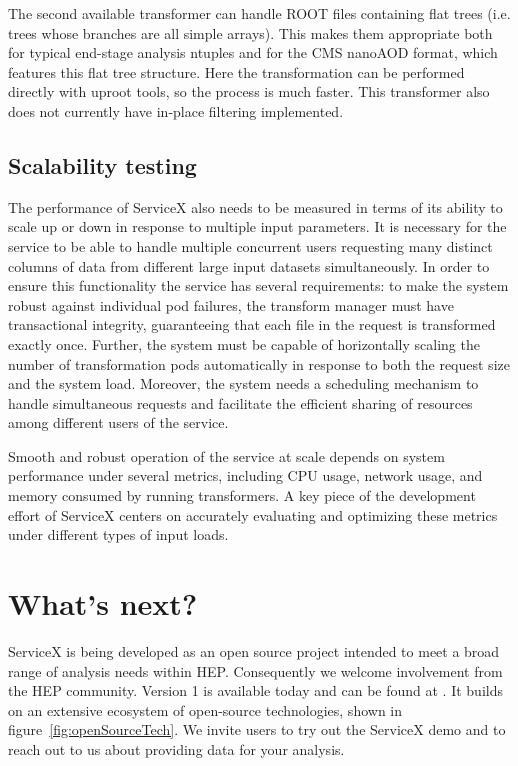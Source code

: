 \documentclass{webofc}
\begin{document}
The second available transformer can handle ROOT files containing flat trees (i.e. trees whose
branches are all simple arrays). This makes them appropriate both for typical end-stage analysis
ntuples and for the CMS nanoAOD format, which features this flat tree structure. Here the
transformation can be performed directly with uproot tools, so the process is much faster. This
transformer also does not currently have in-place filtering implemented.

\subsection{Scalability testing}
\label{subsec:scaling}

The performance of ServiceX also needs to be measured in terms of its ability to scale up or down
in response to multiple input parameters. It is necessary for the service to be able to handle
multiple concurrent users requesting many distinct columns of data from different large input
datasets simultaneously. In order to ensure this functionality the service has several
requirements: to make the system robust against individual pod failures, the transform manager must
have transactional integrity, guaranteeing that each file in the request is transformed exactly
once. Further, the system must be capable of horizontally scaling the number of transformation pods
automatically in response to both the request size and the system load. Moreover, the system needs
a scheduling mechanism to handle simultaneous requests and facilitate the efficient sharing of
resources among different users of the service.

Smooth and robust operation of the service at scale depends on system performance under several
metrics, including CPU usage, network usage, and memory consumed by running transformers. A key
piece of the development effort of ServiceX centers on accurately evaluating and optimizing these
metrics under different types of input loads.

\section{What's next?}
\label{sec:whatNext}

ServiceX is being developed as an open source project intended to meet a broad range of analysis
needs within HEP. Consequently we welcome involvement from the HEP community. Version 1 is
available today and can be found at \cite{RefServiceX}. It builds on an extensive ecosystem of
open-source technologies, shown in figure~\ref{fig:openSourceTech}. We invite users to try out the
ServiceX demo and to reach out to us about providing data for your analysis.
\end{document}
